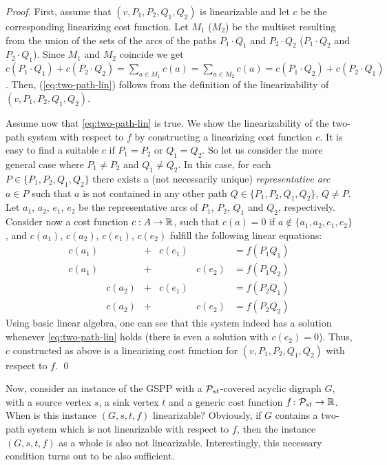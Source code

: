\begin{proof}
    First, assume that $(v,P_1,P_2,Q_1,Q_2)$ is linearizable and let $c$ be the corresponding  linearizing cost function.  Let $M_1$ ($M_2$) be the multiset  resulting from   the union of the sets of the arcs of the paths $P_1\cdot Q_1$ and $P_2\cdot Q_2$  ($P_1\cdot Q_2$ and $P_2 \cdot Q_1$). Since $M_1$ and $M_2$ coincide we get   $c(P_1 \cdot Q_1) + c(P_2 \cdot Q_2) =\sum_{a\in M_1} c(a)= \sum_{a\in M_2} c(a)=c(P_1 \cdot Q_2) + c(P_2 \cdot Q_1)$. Then,   (\ref{eq:two-path-lin}) follows from the definition of the linearizability of   $(v,P_1,P_2,Q_1,Q_2)$.
    
    Assume now  that \cref{eq:two-path-lin} is true. We  show the linearizability of  the two-path system with respect to $f$ by constructing a linearizing cost function $c$.   It is easy to find a suitable  $c$ if $P_1=P_2$ or $Q_1=Q_2$. So let us consider  the more general case  where $P_1\neq P_2$ and $Q_1\neq Q_2$.  In this case, for   each  $P\in \{P_1,P_2,Q_1,Q_2\}$ there exists a (not necessarily unique) \emph{representative arc} $a\in P$ such that $a$  is not contained in any other path  $Q\in \{P_1,P_2,Q_1,Q_2\}$, $Q \neq P$. Let $a_1$, $a_2$, $e_1$, $e_2$ be the representative arcs of $P_1$, $P_2$, $Q_1$ and $Q_2$, respectively.  Consider now a cost function $c : A \rightarrow \mathbb{R}$, such that $c(a) = 0$ if  $a\not\in \{a_1, a_2, e_1, e_2\}$, and $c(a_1)$, $c(a_2)$, $c(e_1)$, 
$c(e_2)$ fulfill the following linear equations:
    \begin{equation*}
        \begin{array}{llcllcl}
        c(a_1) & & + & c(e_1) & & = f(P_1Q_1) \\
        c(a_1) & & + & & c(e_2) &= f(P_1Q_2) \\
        &c(a_2) & + & c(e_1) & &= f(P_2Q_1) \\
        &c(a_2) & + & & c(e_2) &= f(P_2Q_2) 
    \end{array}
    \end{equation*}
    Using basic linear algebra, one can see that this system indeed has a solution whenever  \cref{eq:two-path-lin} holds (there is even a solution with $c(e_2) = 0$). Thus, $c$ constructed as above is a linearizing  cost function for $(v,P_1,P_2,Q_1,Q_2)$ with respect to $f$. 
    \qed
\end{proof}

Now, consider an instance of the GSPP with a $\mathcal{P}_{st}$-covered acyclic digraph $G$, with a  source vertex $s$, a sink vertex $t$ and a generic cost function $f\colon \mathcal{P}_{st}\to \mathbb{R}$. When is this instance $(G,s,t,f)$ linearizable? Obviously, if $G$ contains a two-path system which is not linearizable with respect to $f$, then the instance $(G,s,t,f)$ as a whole is also not linearizable. Interestingly, this necessary condition turns out to be also sufficient.

